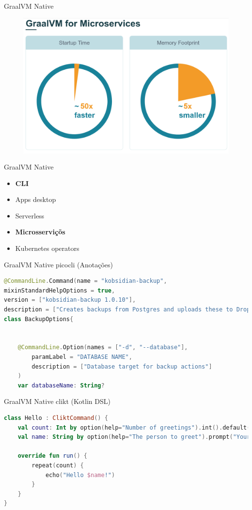 \documentclass[aspectratio=169]{beamer}
\begin{document}
\begin{frame}{GraalVM Native}
	\begin{figure}
		\centering
		\includegraphics[width=0.7\linewidth]{Images/ventajasnative}
	\end{figure}
\end{frame}


\begin{frame}{GraalVM Native}
	\begin{itemize}
		\item \textbf{CLI}
		\item Apps desktop
    		\item Serverless
		\item \textbf{Microsserviçõs}
        \item Kubernetes operators
	\end{itemize}

\end{frame}

\begin{frame}[fragile]{GraalVM Native}
picocli (Anotações)
\begin{lstlisting}[language=Kotlin]
@CommandLine.Command(name = "kobsidian-backup",
mixinStandardHelpOptions = true,
version = ["kobsidian-backup 1.0.10"],
description = ["Creates backups from Postgres and uploads these to Dropbox"])
class BackupOptions{


    @CommandLine.Option(names = ["-d", "--database"],
        paramLabel = "DATABASE NAME",
        description = ["Database target for backup actions"]
    )
    var databaseName: String?
\end{lstlisting}
\end{frame}

\begin{frame}[fragile]{GraalVM Native}
clikt (Kotlin DSL)
\begin{lstlisting}[language=Kotlin]
class Hello : CliktCommand() {
    val count: Int by option(help="Number of greetings").int().default(1)
    val name: String by option(help="The person to greet").prompt("Your name")

    override fun run() {
        repeat(count) {
            echo("Hello $name!")
        }
    }
}
\end{lstlisting}
\end{frame}
\end{document}

